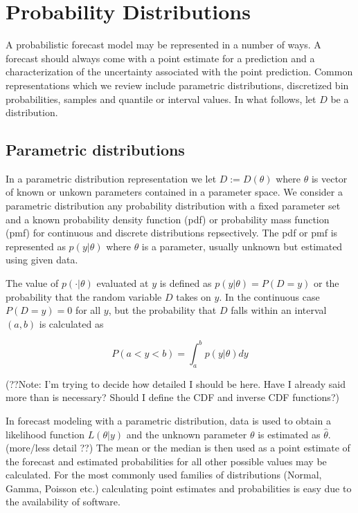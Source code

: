 \documentclass{article}\usepackage[]{graphicx}\usepackage[]{color}
\begin{document}
\section{Probability Distributions}

A probabilistic forecast model may be represented in a number of ways. A 
forecast should always come with a point estimate for a prediction and a 
characterization of the uncertainty associated with the point prediction.
Common representations which we review include parametric distributions,
discretized bin probabilities, samples and quantile or interval values.
In what follows, let $D$ be a distribution.

\subsection{Parametric distributions}
In a parametric distribution representation we let $D := D(\theta)$ 
where $\theta$ is vector of known or unkown parameters contained in a parameter 
space. We consider a parametric distribution any probability distribution with a 
fixed parameter set and a known probability density function (pdf) or 
probability mass function (pmf) for continuous and discrete distributions
repsectively. The pdf or pmf is represented as $p(y|\theta)$ where $\theta$ is 
a parameter, usually unknown but estimated using given data.

The value of $p(\cdot|\theta)$ evaluated at $y$ is defined as 
$p(y|\theta) = P(D = y)$ or the probability that the random variable $D$ takes
on $y$. In the continuous case $P(D = y) = 0$ for all $y$, but the probability 
that $D$ falls within an interval $(a,b)$ is calculated as

$$P(a < y < b) = \int_a^b p(y|\theta) dy$$

(??Note: I'm trying to decide how detailed I should be here. Have I already said
more than is necessary? Should I define the CDF and inverse CDF functions?)
 
In forecast modeling with a parametric distribution, data is used to obtain a 
likelihood function $L(\theta|y)$ and the unknown parameter $\theta$ is 
estimated as $\hat{\theta}$. (more/less detail ??) The mean or the median is
then used as a point estimate of the forecast and estimated probabilities for 
all other possible values may be calculated. For the most commonly used families
of distributions (Normal, Gamma, Poisson etc.) calculating point estimates and 
probabilities is easy due to the availability of software.
\end{document}
